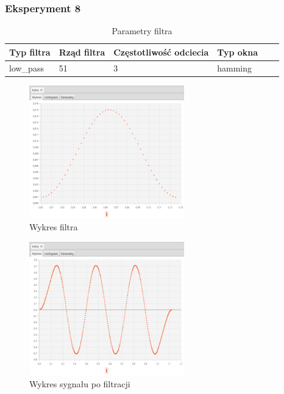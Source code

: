 \documentclass[12pt]{article}
\begin{document}
{{            \subsubsection{Eksperyment 8} {
                \begin{table}[H]
                \centering
                \begin{tabular}{|l|l|l|l|l|l|}
                \hline
                Typ filtra & Rząd filtra & Częstotliwość odciecia & Typ okna  \\\hline
                low\_pass & 51 & 3 & hamming     \\\hline
                \end{tabular}
                \caption{Parametry filtra}
                \end{table}
                \begin{figure}[H]
                \centering
                \includegraphics[width=0.6\textwidth]{img/result/filter/experiment08/data_draw_3a_filter_data_114037.png}
                \caption{Wykres filtra}
                \end{figure}

                \begin{figure}[H]
                \centering
                \includegraphics[width=0.6\textwidth]{img/result/filter/experiment08/data_draw_3a_result_data_114041.png}
                \caption{Wykres sygnału po filtracji}
                \end{figure}
            }
            \newpage

}}
\end{document}
